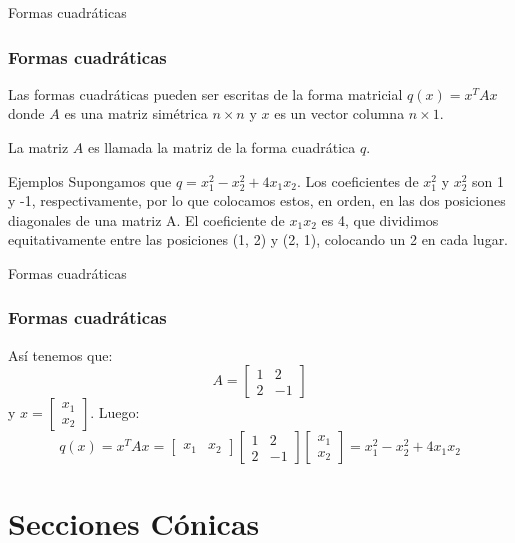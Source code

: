 \documentclass[xcolor={dvipsnames},aspectratio=169,10pt]{beamer}
\begin{document}
\begin{frame}{Formas cuadráticas}
  \frametitle{Formas cuadráticas}
  Las formas cuadráticas pueden ser escritas de la forma matricial $q(x) = x^{T}Ax$ donde $A$ es una matriz simétrica $n 
  \times n$ y $x$ es un vector columna $n \times 1$.

  La matriz $A$ es llamada la matriz de la forma cuadrática $q$.

  \begin{block}{Ejemplos}
    Supongamos que $q = x_1^2 - x_2^2 + 4x_1x_2$. Los coeficientes de $x_1^2$ y $x_2^2$ son 1 y -1, 
    respectivamente, por lo que colocamos estos, en orden, en las dos posiciones diagonales de una matriz A. 
    El coeficiente de $x_1x_2$ es 4, que dividimos equitativamente entre las posiciones (1, 2) y (2, 1), 
    colocando un 2 en cada lugar.
  \end{block}
\end{frame}

\begin{frame}{Formas cuadráticas}
  \frametitle{Formas cuadráticas}
  Así tenemos que:
  \begin{equation*}
    A = \begin{bmatrix}
      1 & 2 \\
      2 & -1
    \end{bmatrix}
  \end{equation*}
  y $x = \begin{bmatrix}
    x_1 \\
    x_2
  \end{bmatrix}$.
  Luego:
  \begin{equation*}
    q(x) = x^{T}Ax = \begin{bmatrix}
      x_1 & x_2
    \end{bmatrix}
    \begin{bmatrix}
      1 & 2 \\
      2 & -1
    \end{bmatrix}
    \begin{bmatrix}
      x_1 \\
      x_2
    \end{bmatrix}
    = x_1^2 - x_2^2 + 4x_1x_2
  \end{equation*}
\end{frame}

\section{Secciones Cónicas}
\end{document}
